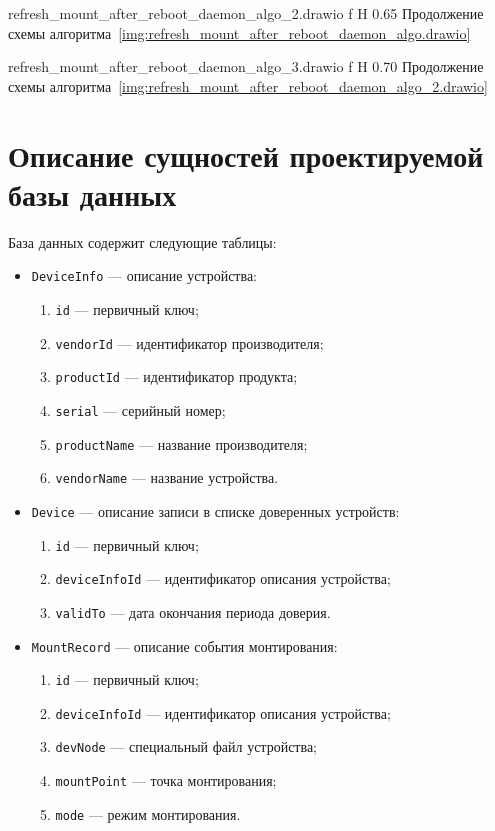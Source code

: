     {refresh_mount_after_reboot_daemon_algo_2.drawio}
    {f}
    {H}
    {0.65\textwidth}
    {Продолжение схемы алгоритма~\ref{img:refresh_mount_after_reboot_daemon_algo.drawio}}

    {refresh_mount_after_reboot_daemon_algo_3.drawio}
    {f}
    {H}
    {0.70\textwidth}
    {Продолжение схемы алгоритма~\ref{img:refresh_mount_after_reboot_daemon_algo_2.drawio}}

\section{Описание сущностей проектируемой базы данных}

База данных содержит следующие таблицы:

\begin{itemize}[label=---]
    \item \texttt{DeviceInfo} --- описание устройства:
    \begin{enumerate}
        \item \texttt{id} --- первичный ключ;
        \item \texttt{vendorId} --- идентификатор производителя;
        \item \texttt{productId} --- идентификатор продукта;
        \item \texttt{serial} --- серийный номер;
        \item \texttt{productName} --- название производителя;
        \item \texttt{vendorName} --- название устройства.
    \end{enumerate}
    \item \texttt{Device} --- описание записи в списке доверенных устройств:
    \begin{enumerate}
        \item \texttt{id} --- первичный ключ;
        \item \texttt{deviceInfoId} --- идентификатор описания устройства;
        \item \texttt{validTo} --- дата окончания периода доверия.
    \end{enumerate}
    \item \texttt{MountRecord} --- описание события монтирования:
    \begin{enumerate}
        \item \texttt{id} --- первичный ключ;
        \item \texttt{deviceInfoId} --- идентификатор описания устройства;
        \item \texttt{devNode} --- специальный файл устройства;
        \item \texttt{mountPoint} --- точка монтирования;
        \item \texttt{mode} --- режим монтирования.
    \end{enumerate}
\end{itemize}

